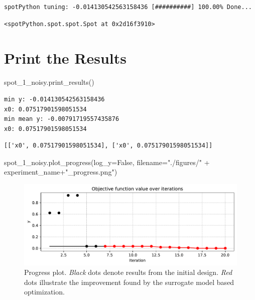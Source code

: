 \documentclass[
  letterpaper,
  DIV=11,
  numbers=noendperiod]{scrreprt}
\newenvironment{Shaded}{\begin{snugshade}}{\end{snugshade}}
\newcommand{\NormalTok}[1]{\textcolor[rgb]{0.00,0.23,0.31}{#1}}
\newcommand{\OperatorTok}[1]{\textcolor[rgb]{0.37,0.37,0.37}{#1}}
\newcommand{\StringTok}[1]{\textcolor[rgb]{0.13,0.47,0.30}{#1}}
\newcommand{\VariableTok}[1]{\textcolor[rgb]{0.07,0.07,0.07}{#1}}
\begin{document}
\begin{verbatim}
spotPython tuning: -0.014130542563158436 [##########] 100.00% Done...
\end{verbatim}

\begin{verbatim}
<spotPython.spot.spot.Spot at 0x2d16f3910>
\end{verbatim}

\hypertarget{print-the-results-3}{%
\section{Print the Results}\label{print-the-results-3}}

\begin{Shaded}
\begin{Highlighting}[]
\NormalTok{spot\_1\_noisy.print\_results()}
\end{Highlighting}
\end{Shaded}

\begin{verbatim}
min y: -0.014130542563158436
x0: 0.07517901598051534
min mean y: -0.00791719557435876
x0: 0.07517901598051534
\end{verbatim}

\begin{verbatim}
[['x0', 0.07517901598051534], ['x0', 0.07517901598051534]]
\end{verbatim}

\begin{Shaded}
\begin{Highlighting}[]
\NormalTok{spot\_1\_noisy.plot\_progress(log\_y}\OperatorTok{=}\VariableTok{False}\NormalTok{,}
\NormalTok{    filename}\OperatorTok{=}\StringTok{"./figures/"} \OperatorTok{+}\NormalTok{ experiment\_name}\OperatorTok{+}\StringTok{"\_progress.png"}\NormalTok{)}
\end{Highlighting}
\end{Shaded}

\begin{figure}[H]

{\centering \includegraphics{013_num_spot_noisy_files/figure-pdf/cell-12-output-1.pdf}

}

\caption{Progress plot. \emph{Black} dots denote results from the
initial design. \emph{Red} dots illustrate the improvement found by the
surrogate model based optimization.}

\end{figure}
\end{document}
